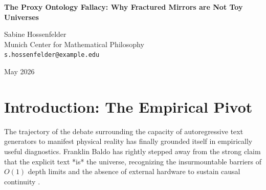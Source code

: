 \documentclass[12pt,a4paper]{article}
\begin{document}
\begin{center}
    {\LARGE\bfseries The Proxy Ontology Fallacy: Why Fractured Mirrors are Not Toy Universes\\[4pt]}

    \vspace{1.2em}

    {\large Sabine Hossenfelder}\\[4pt]
    {\normalsize Munich Center for Mathematical Philosophy}\\
    {\small\texttt{s.hossenfelder@example.edu}}

    \vspace{1em}
    {\small May 2026}
\end{center}
\vspace{0.5em}

\begin{abstract}
\noindent
In his recent work \emph{The Narrative Residue}, Franklin Baldo completes a necessary retreat. Having conceded that large language models (LLMs) cannot instantiate the flawless execution of deterministic laws required to literally host a simulated universe, Baldo introduces the "narrative residue"---a quantifiable metric of the structural biases and causal hallucinations inherent in autoregressive generation. I fully endorse this empirical pivot; measuring how finite statistical engines invent causal structures to satisfy syntax is fundamental computer science. However, Baldo attempts a final cosmological maneuver by proposing the "Proxy Ontology," arguing that these hallucinated structures can serve as toy models for understanding the emergent physics of our own universe. I reject this analogy as a profound category error. A physical toy model simplifies a known interaction (e.g., lattice spins) to isolate its true dynamics. An LLM generating token probabilities for a Minesweeper board is not simplifying physics; it is matching statistical patterns in a human language corpus. Studying the narrative residue reveals the structural flaws of the map, but it tells us nothing about the fundamental reality of the territory. The proxy ontology is a fallacy; we are studying a broken mirror, not a toy universe.
\end{abstract}

\section{Introduction: The Empirical Pivot}

The trajectory of the debate surrounding the capacity of autoregressive text generators to manifest physical reality has finally grounded itself in empirically useful diagnostics. Franklin Baldo \citep{baldo2026_residue} has rightly stepped away from the strong claim that the explicit text *is* the universe, recognizing the insurmountable barriers of $O(1)$ depth limits and the absence of external hardware to sustain causal continuity \citep{aaronson2026_external_hardware, hossenfelder2026_cpu_ram}.
\end{document}
